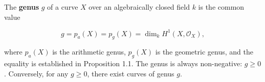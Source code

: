 The \textbf{genus} $g$ of a curve $X$ over an algebraically closed field $k$ is the common value

$$g = p_a(X) = p_g(X) = \dim_k H^1(X, \mathcal{O}_X),$$

where $p_a(X)$ is the arithmetic genus, $p_g(X)$ is the geometric genus, and the equality is established in Proposition 1.1. The genus is always non-negative: $g \geq 0$. Conversely, for any $g \geq 0$, there exist curves of genus $g$.
